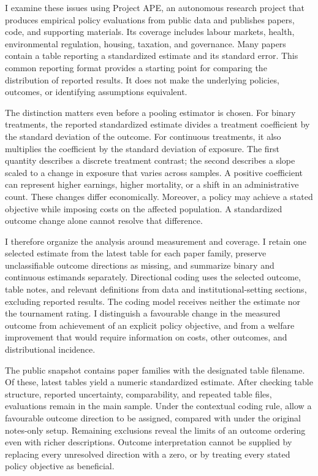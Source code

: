 \documentclass[11pt]{article}
\begin{document}
I examine these issues using Project APE, an autonomous research project that produces empirical policy evaluations from public data and publishes papers, code, and supporting materials. Its coverage includes labour markets, health, environmental regulation, housing, taxation, and governance. Many papers contain a table reporting a standardized estimate and its standard error. This common reporting format provides a starting point for comparing the distribution of reported results. It does not make the underlying policies, outcomes, or identifying assumptions equivalent.

The distinction matters even before a pooling estimator is chosen. For binary treatments, the reported standardized estimate divides a treatment coefficient by the standard deviation of the outcome. For continuous treatments, it also multiplies the coefficient by the standard deviation of exposure. The first quantity describes a discrete treatment contrast; the second describes a slope scaled to a change in exposure that varies across samples. A positive coefficient can represent higher earnings, higher mortality, or a shift in an administrative count. These changes differ economically. Moreover, a policy may achieve a stated objective while imposing costs on the affected population. A standardized outcome change alone cannot resolve that difference.

I therefore organize the analysis around measurement and coverage. I retain one selected estimate from the latest table for each paper family, preserve unclassifiable outcome directions as missing, and summarize binary and continuous estimands separately. Directional coding uses the selected outcome, table notes, and relevant definitions from data and institutional-setting sections, excluding reported results. The coding model receives neither the estimate nor the tournament rating. I distinguish a favourable change in the measured outcome from achievement of an explicit policy objective, and from a welfare improvement that would require information on costs, other outcomes, and distributional incidence.

The public snapshot contains \FamiliesN{} paper families with the designated table filename. Of these, \NumericN{} latest tables yield a numeric standardized estimate. After checking table structure, reported uncertainty, comparability, and repeated table files, \StandardizedN{} evaluations remain in the main sample. Under the contextual coding rule, \OrientedN{} allow a favourable outcome direction to be assigned, compared with \OriginalOrientedN{} under the original notes-only setup. Remaining exclusions reveal the limits of an outcome ordering even with richer descriptions. Outcome interpretation cannot be supplied by replacing every unresolved direction with a zero, or by treating every stated policy objective as beneficial.
\end{document}
